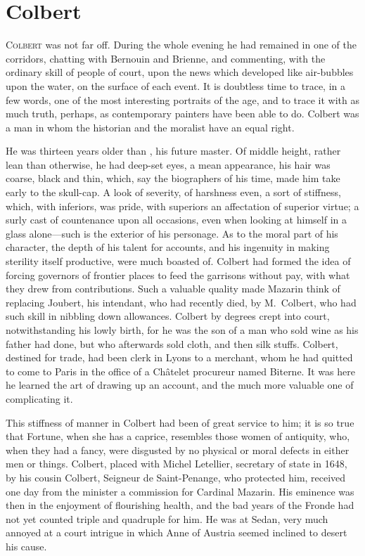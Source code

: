 \chapter{Colbert}

\lettrine{C}{olbert} was not far off. During the whole evening he had remained in one of the corridors, chatting with Bernouin and Brienne, and commenting, with the ordinary skill of people of court, upon the news which developed like air-bubbles upon the water, on the surface of each event. It is doubtless time to trace, in a few words, one of the most interesting portraits of the age, and to trace it with as much truth, perhaps, as contemporary painters have been able to do. Colbert was a man in whom the historian and the moralist have an equal right.

He was thirteen years older than , his future master. Of middle height, rather lean than otherwise, he had deep-set eyes, a mean appearance, his hair was coarse, black and thin, which, say the biographers of his time, made him take early to the skull-cap. A look of severity, of harshness even, a sort of stiffness, which, with inferiors, was pride, with superiors an affectation of superior virtue; a surly cast of countenance upon all occasions, even when looking at himself in a glass alone—such is the exterior of his personage. As to the moral part of his character, the depth of his talent for accounts, and his ingenuity in making sterility itself productive, were much boasted of. Colbert had formed the idea of forcing governors of frontier places to feed the garrisons without pay, with what they drew from contributions. Such a valuable quality made Mazarin think of replacing Joubert, his intendant, who had recently died, by M.~Colbert, who had such skill in nibbling down allowances. Colbert by degrees crept into court, notwithstanding his lowly birth, for he was the son of a man who sold wine as his father had done, but who afterwards sold cloth, and then silk stuffs. Colbert, destined for trade, had been clerk in Lyons to a merchant, whom he had quitted to come to Paris in the office of a Châtelet procureur named Biterne. It was here he learned the art of drawing up an account, and the much more valuable one of complicating it.

This stiffness of manner in Colbert had been of great service to him; it is so true that Fortune, when she has a caprice, resembles those women of antiquity, who, when they had a fancy, were disgusted by no physical or moral defects in either men or things. Colbert, placed with Michel Letellier, secretary of state in 1648, by his cousin Colbert, Seigneur de Saint-Penange, who protected him, received one day from the minister a commission for Cardinal Mazarin. His eminence was then in the enjoyment of flourishing health, and the bad years of the Fronde had not yet counted triple and quadruple for him. He was at Sedan, very much annoyed at a court intrigue in which Anne of Austria seemed inclined to desert his cause.

